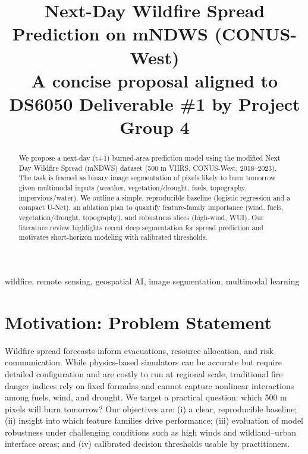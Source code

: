 \documentclass[conference]{IEEEtran}
\begin{document}
\title{Next-Day Wildfire Spread Prediction on mNDWS (CONUS-West)\\
{\footnotesize A concise proposal aligned to DS6050 Deliverable \#1 by Project Group 4}
}

\author{
}


\maketitle

\begin{abstract}
We propose a next-day (t+1) burned-area prediction model using the modified Next Day Wildfire Spread (mNDWS) dataset (500 m VIIRS, CONUS-West, 2018--2023). The task is framed as binary image segmentation of pixels likely to burn tomorrow given multimodal inputs (weather, vegetation/drought, fuels, topography, impervious/water). We outline a simple, reproducible baseline (logistic regression and a compact U-Net), an ablation plan to quantify feature-family importance (wind, fuels, vegetation/drought, topography), and robustness slices (high-wind, WUI). Our literature review highlights recent deep segmentation for spread prediction and motivates short-horizon modeling with calibrated thresholds.
\end{abstract}

\begin{IEEEkeywords}
wildfire, remote sensing, geospatial AI, image segmentation, multimodal learning
\end{IEEEkeywords}

\section{Motivation: Problem Statement}
Wildfire spread forecasts inform evacuations, resource allocation, and risk communication. While physics-based simulators can be accurate but require detailed configuration and are costly to run at regional scale, traditional fire danger indices rely on fixed formulas and cannot capture nonlinear interactions among fuels, wind, and drought. We target a practical question: which 500 m pixels will burn tomorrow? Our objectives are: (i) a clear, reproducible baseline; (ii) insight into which feature families drive performance; (iii) evaluation of model robustness under challenging conditions such as high winds and wildland–urban interface areas; and (iv) calibrated decision thresholds usable by practitioners.
\end{document}
